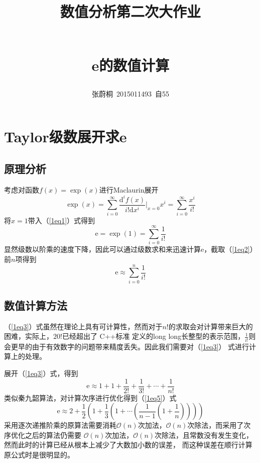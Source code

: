 \documentclass[onecolumn,compsoc]{IEEEtran}
\title{\begin{large}数值分析第二次大作业\end{large}\\ e的数值计算}
\author{张蔚桐\ 2015011493\ 自55}
\renewcommand{\d}{\mathrm{d}}
\renewcommand{\|}{\Bigg |}
\newcommand{\e}{\mathrm{e}}
\begin{document}
\maketitle
\tableofcontents
\clearpage
\section{Taylor级数展开求e}
\subsection{原理分析}
考虑对函数$f(x) = \exp(x)$进行Maclaurin展开
\begin{equation}\label{1eq1}
\exp(x) = \sum_{i=0}^{\infty} \frac{\d^if(x)}{i!\d x^i}\|_{x = 0}x^i =  \sum_{i=0}^{\infty}\frac{x^i}{i!}
\end{equation}
将$x = 1$带入（\ref{1eq1}）式得到
\begin{equation}\label{1eq2}
\e = \exp(1) = \sum_{i=0}^{\infty}\frac{1}{i!}
\end{equation}
显然级数以阶乘的速度下降，因此可以通过级数求和来迅速计算$\e$，截取（\ref{1eq2}）前$n$项得到
\begin{equation}\label{1eq3}
\e \approx \sum_{i=0}^{n}\frac{1}{i!}
\end{equation}
\subsection{数值计算方法}
（\ref{1eq3}）式虽然在理论上具有可计算性，然而对于$n!$的求取会对计算带来巨大的困难，实际上，$20!$已经超出了 C++标准
定义的long long长整型的表示范围，$\frac{1}{i!}$则会更早的由于有效数字的问题带来精度丢失。因此我们需要对（\ref{1eq3}）
式进行计算上的处理。

展开（\ref{1eq3}）式，得到
\begin{equation}\label{1eq4}
\e \approx 1 + 1 + \frac{1}{2!} + \frac{1}{3!} + \cdots + \frac{1}{n!}
\end{equation}
类似秦九韶算法，对计算次序进行优化得到（\ref{1eq5}）式
\begin{equation}\label{1eq5}
\e\approx 2 + \frac{1}{2} (1 + \frac{1}{3}(1 + \cdots (\frac{1}{n-1}(1 + \frac{1}{n}))))
\end{equation}
采用逐次递推阶乘的原算法需要消耗$\mathcal{O}(n)$次加法，$\mathcal{O}(n)$次除法，而采用了次序优化之后的算法仍需要
$\mathcal{O}(n)$次加法，$\mathcal{O}(n)$次除法，且常数没有发生变化，然而此时的计算已经从根本上减少了大数加小数的误差，
而这种误差在顺行计算原公式时是很明显的。
\end{document}

